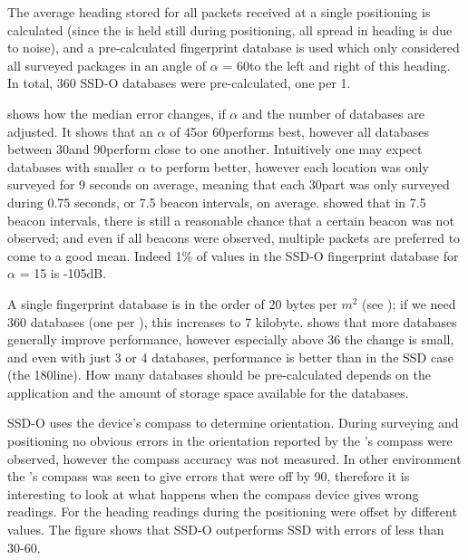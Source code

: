 The average heading stored for all packets received at a single positioning is calculated (since the \device is held still during positioning, all spread in heading is due to noise), and a pre-calculated fingerprint database is used which only considered all surveyed packages in an angle of $\alpha$ = 60\textdegree to the left and right of this heading.
In total, 360 SSD-O databases were pre-calculated, one per 1\textdegree.

 shows how the median error changes, if $\alpha$ and the number of databases are adjusted.
It shows that an $\alpha$ of 45\textdegree or 60\textdegree performs best, however all databases between 30\textdegree and 90\textdegree perform close to one another.
Intuitively one may expect databases with smaller $\alpha$ to perform better, however each location was only surveyed for 9 seconds on average, meaning that each 30\textdegree part was only surveyed during 0.75 seconds, or 7.5 beacon intervals, on average.
 showed that in 7.5 beacon intervals, there is still a reasonable chance that a certain beacon was not observed; and even if all beacons were observed, multiple packets are preferred to come to a good mean.
Indeed 1\% of values in the SSD-O fingerprint database for $\alpha$ = 15 is -105dB.

A single fingerprint database is in the order of 20 bytes per $m^2$ (see ); if we need 360 databases (one per \textdegree), this increases to 7 kilobyte.
 shows that more databases generally improve performance, however especially above 36 the change is small, and even with just 3 or 4 databases, performance is better than in the SSD case (the 180\textdegree line).
How many databases should be pre-calculated depends on the application and the amount of storage space available for the databases.

SSD-O uses the device's compass to determine orientation.
During surveying and positioning no obvious errors in the orientation reported by the \device's compass were observed, however the compass accuracy was not measured.
In other environment the \device's compass was seen to give errors that were off by 90\textdegree, therefore it is interesting to look at what happens when the compass device gives wrong readings.
For  the heading readings during the positioning were offset by different values.
The figure shows that SSD-O outperforms SSD with errors of less than 30-60\textdegree.

